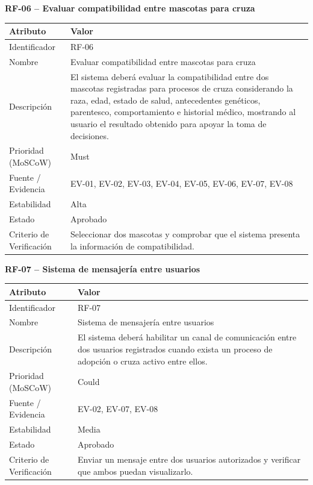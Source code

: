 \documentclass[journal,onecolumn]{IEEEtran}
\begin{document}
	\textbf{RF-06 -- Evaluar compatibilidad entre mascotas para cruza}
	\begin{table}[H]
		\centering\small
		\begin{tabularx}{\linewidth}{|l|X|}
			\hline
			\textbf{Atributo} & \textbf{Valor} \\ \hline
			Identificador & RF-06 \\ \hline
			Nombre & Evaluar compatibilidad entre mascotas para cruza \\ \hline
			Descripción & El sistema deberá evaluar la compatibilidad entre dos mascotas registradas para procesos de cruza considerando la raza, edad, estado de salud, antecedentes genéticos, parentesco, comportamiento e historial médico, mostrando al usuario el resultado obtenido para apoyar la toma de decisiones. \\ \hline
			Prioridad (MoSCoW) & Must \\ \hline
			Fuente / Evidencia & EV-01, EV-02, EV-03, EV-04, EV-05, EV-06, EV-07, EV-08 \\ \hline
			Estabilidad & Alta \\ \hline
			Estado & Aprobado \\ \hline
			Criterio de Verificación & Seleccionar dos mascotas y comprobar que el sistema presenta la información de compatibilidad. \\ \hline
		\end{tabularx}
	\end{table}
	
	\textbf{RF-07 -- Sistema de mensajería entre usuarios}
	\begin{table}[H]
		\centering\small
		\begin{tabularx}{\linewidth}{|l|X|}
			\hline
			\textbf{Atributo} & \textbf{Valor} \\ \hline
			Identificador & RF-07 \\ \hline
			Nombre & Sistema de mensajería entre usuarios \\ \hline
			Descripción & El sistema deberá habilitar un canal de comunicación entre dos usuarios registrados cuando exista un proceso de adopción o cruza activo entre ellos. \\ \hline
			Prioridad (MoSCoW) & Could \\ \hline
			Fuente / Evidencia & EV-02, EV-07, EV-08 \\ \hline
			Estabilidad & Media \\ \hline
			Estado & Aprobado \\ \hline
			Criterio de Verificación & Enviar un mensaje entre dos usuarios autorizados y verificar que ambos puedan visualizarlo. \\ \hline
		\end{tabularx}
	\end{table}
	
\end{document}
